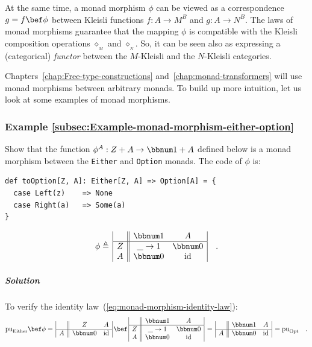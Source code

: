 At the same time, a monad morphism $\phi$ can be viewed as a correspondence
$g=f\bef\phi$ between Kleisli functions $f:A\rightarrow M^{B}$ and
$g:A\rightarrow N^{B}$. The laws of monad morphisms guarantee that
the mapping $\phi$ is compatible with the Kleisli composition operations
$\diamond_{_{M}}$ and $\diamond_{_{N}}$. So, it can be seen also
as expressing a (categorical) \emph{functor}
between the $M$-Kleisli and the $N$-Kleisli categories.

Chapters~\ref{chap:Free-type-constructions} and~\ref{chap:monad-transformers}
will use monad morphisms between arbitrary monads. To build up more
intuition, let us look at some examples of monad morphisms.

\subsubsection{Example \label{subsec:Example-monad-morphism-either-option}\ref{subsec:Example-monad-morphism-either-option}}

Show that the function $\phi^{A}:Z+A\rightarrow\bbnum 1+A$ defined
below is a monad morphism between the \lstinline!Either! and \lstinline!Option!
monads. The code of $\phi$ is:
\begin{lstlisting}
def toOption[Z, A]: Either[Z, A] => Option[A] = {
  case Left(z)    => None
  case Right(a)   => Some(a)
}
\end{lstlisting}
\[
\phi\triangleq\,\begin{array}{|c||cc|}
 & \bbnum 1 & A\\
\hline Z & \_\rightarrow1 & \bbnum 0\\
A & \bbnum 0 & \text{id}
\end{array}\quad.
\]


\subparagraph{Solution}

To verify the identity law~(\ref{eq:monad-morphism-identity-law}):
\[
\text{pu}_{\text{Either}}\bef\phi=\,\begin{array}{|c||cc|}
 & Z & A\\
\hline A & \bbnum 0 & \text{id}
\end{array}\,\bef\,\begin{array}{|c||cc|}
 & \bbnum 1 & A\\
\hline Z & \_\rightarrow1 & \bbnum 0\\
A & \bbnum 0 & \text{id}
\end{array}\,=\,\begin{array}{|c||cc|}
 & \bbnum 1 & A\\
\hline A & \bbnum 0 & \text{id}
\end{array}\,=\text{pu}_{\text{Opt}}\quad.
\]

